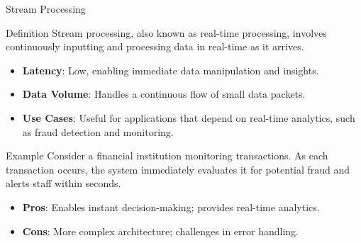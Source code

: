 \documentclass[aspectratio=169]{beamer}
\begin{document}
\begin{frame}[fragile]{Stream Processing}
    \begin{block}{Definition}
        Stream processing, also known as real-time processing, involves continuously inputting and processing data in real-time as it arrives.
    \end{block}
    
    \begin{itemize}
        \item \textbf{Latency}: Low, enabling immediate data manipulation and insights.
        \item \textbf{Data Volume}: Handles a continuous flow of small data packets.
        \item \textbf{Use Cases}: Useful for applications that depend on real-time analytics, such as fraud detection and monitoring.
    \end{itemize}
    
    \begin{block}{Example}
        Consider a financial institution monitoring transactions. As each transaction occurs, the system immediately evaluates it for potential fraud and alerts staff within seconds.
    \end{block}
    
    \begin{itemize}
        \item \textbf{Pros}: Enables instant decision-making; provides real-time analytics.
        \item \textbf{Cons}: More complex architecture; challenges in error handling.
    \end{itemize}
\end{frame}
\end{document}
